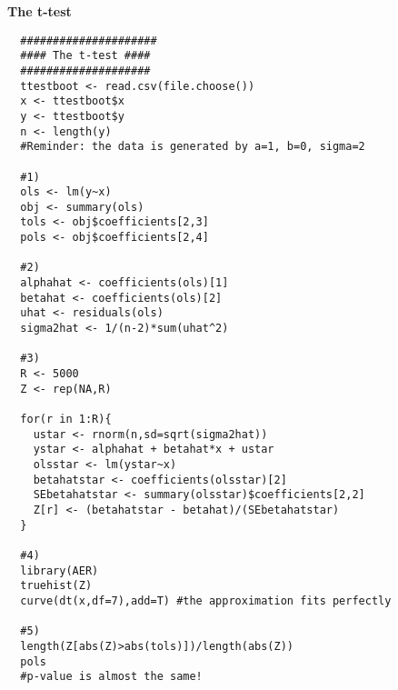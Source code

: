 \begin{Solution}{16.4}
\textbf{The t-test}

\begin{verbatim}
  #####################
  #### The t-test ####
  ####################
  ttestboot <- read.csv(file.choose())
  x <- ttestboot$x
  y <- ttestboot$y
  n <- length(y)
  #Reminder: the data is generated by a=1, b=0, sigma=2

  #1)
  ols <- lm(y~x)
  obj <- summary(ols)
  tols <- obj$coefficients[2,3]
  pols <- obj$coefficients[2,4]

  #2)
  alphahat <- coefficients(ols)[1]
  betahat <- coefficients(ols)[2]
  uhat <- residuals(ols)
  sigma2hat <- 1/(n-2)*sum(uhat^2)

  #3)
  R <- 5000
  Z <- rep(NA,R)

  for(r in 1:R){
    ustar <- rnorm(n,sd=sqrt(sigma2hat))
    ystar <- alphahat + betahat*x + ustar
    olsstar <- lm(ystar~x)
    betahatstar <- coefficients(olsstar)[2]
    SEbetahatstar <- summary(olsstar)$coefficients[2,2]
    Z[r] <- (betahatstar - betahat)/(SEbetahatstar)
  }

  #4)
  library(AER)
  truehist(Z)
  curve(dt(x,df=7),add=T) #the approximation fits perfectly

  #5)
  length(Z[abs(Z)>abs(tols)])/length(abs(Z))
  pols
  #p-value is almost the same!
\end{verbatim}
\end{Solution}
